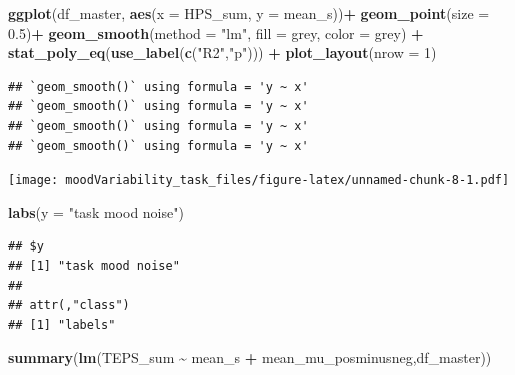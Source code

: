 \documentclass[
]{article}
\newenvironment{Shaded}{\begin{snugshade}}{\end{snugshade}}
\newcommand{\AttributeTok}[1]{\textcolor[rgb]{0.13,0.29,0.53}{#1}}
\newcommand{\DecValTok}[1]{\textcolor[rgb]{0.00,0.00,0.81}{#1}}
\newcommand{\FloatTok}[1]{\textcolor[rgb]{0.00,0.00,0.81}{#1}}
\newcommand{\FunctionTok}[1]{\textcolor[rgb]{0.13,0.29,0.53}{\textbf{#1}}}
\newcommand{\NormalTok}[1]{#1}
\newcommand{\SpecialCharTok}[1]{\textcolor[rgb]{0.81,0.36,0.00}{\textbf{#1}}}
\newcommand{\StringTok}[1]{\textcolor[rgb]{0.31,0.60,0.02}{#1}}
\begin{document}
\begin{Shaded}
\begin{Highlighting}[]
\FunctionTok{ggplot}\NormalTok{(df\_master, }\FunctionTok{aes}\NormalTok{(}\AttributeTok{x =}\NormalTok{ HPS\_sum, }\AttributeTok{y =}\NormalTok{ mean\_s))}\SpecialCharTok{+}
  \FunctionTok{geom\_point}\NormalTok{(}\AttributeTok{size =} \FloatTok{0.5}\NormalTok{)}\SpecialCharTok{+}
  \FunctionTok{geom\_smooth}\NormalTok{(}\AttributeTok{method =} \StringTok{"lm"}\NormalTok{, }\AttributeTok{fill =} \StringTok{\textquotesingle{}grey\textquotesingle{}}\NormalTok{, }\AttributeTok{color =} \StringTok{\textquotesingle{}grey\textquotesingle{}}\NormalTok{) }\SpecialCharTok{+}
  \FunctionTok{stat\_poly\_eq}\NormalTok{(}\FunctionTok{use\_label}\NormalTok{(}\FunctionTok{c}\NormalTok{(}\StringTok{"R2"}\NormalTok{,}\StringTok{"p"}\NormalTok{))) }\SpecialCharTok{+}
  \FunctionTok{plot\_layout}\NormalTok{(}\AttributeTok{nrow =} \DecValTok{1}\NormalTok{)}
\end{Highlighting}
\end{Shaded}

\begin{verbatim}
## `geom_smooth()` using formula = 'y ~ x'
## `geom_smooth()` using formula = 'y ~ x'
## `geom_smooth()` using formula = 'y ~ x'
## `geom_smooth()` using formula = 'y ~ x'
\end{verbatim}

\texttt{[image: moodVariability\_task\_files/figure-latex/unnamed-chunk-8-1.pdf]}

\begin{Shaded}
\begin{Highlighting}[]
  \FunctionTok{labs}\NormalTok{(}\AttributeTok{y =} \StringTok{"task mood noise"}\NormalTok{)}
\end{Highlighting}
\end{Shaded}

\begin{verbatim}
## $y
## [1] "task mood noise"
## 
## attr(,"class")
## [1] "labels"
\end{verbatim}

\begin{Shaded}
\begin{Highlighting}[]
\FunctionTok{summary}\NormalTok{(}\FunctionTok{lm}\NormalTok{(TEPS\_sum }\SpecialCharTok{\textasciitilde{}}\NormalTok{ mean\_s }\SpecialCharTok{+}\NormalTok{ mean\_mu\_posminusneg,df\_master))}
\end{Highlighting}
\end{Shaded}
\end{document}
